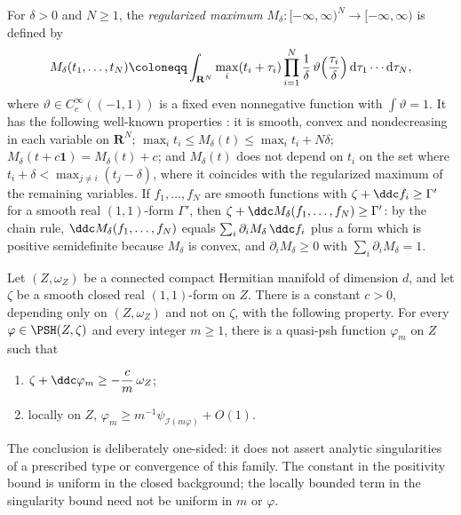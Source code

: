 For $\delta>0$ and $N\ge1$, the \emph{regularized maximum}
$M_\delta\colon[-\infty,\infty)^N\to[-\infty,\infty)$ is defined by
\[
  M_\delta(t_1,\dots,t_N)\coloneqq \int_{\mathbf R^N}\max_i(t_i+\tau_i)
  \prod_{i=1}^N\frac1\delta\,\vartheta\Bigl(\frac{\tau_i}\delta\Bigr)
  \,\mathrm{d}\tau_1\cdots \mathrm{d}\tau_N,
\]
where $\vartheta\in C^\infty_c((-1,1))$ is a fixed even nonnegative
function with $\int\vartheta=1$. It has the following well-known
properties \cite[Chapter~I, Lemma~5.18]{DemCADG}: it is smooth, convex and
nondecreasing in each variable on $\mathbf R^N$;
$\max_it_i\le M_\delta(t)\le\max_it_i+N\delta$;
$M_\delta(t+c\mathbf 1)=M_\delta(t)+c$; and $M_\delta(t)$ does not
depend on $t_i$ on the set where
$t_i+\delta<\max_{j\ne i}(t_j-\delta)$, where it coincides with the
regularized maximum of the remaining variables. If $f_1,\dots,f_N$ are
smooth functions with $\zeta+\ddc f_i\ge\Gamma'$ for a smooth real
$(1,1)$-form $\Gamma'$, then
$\zeta+\ddc M_\delta(f_1,\dots,f_N)\ge\Gamma'$: by the chain rule,
$\ddc M_\delta(f_1,\dots,f_N)$ equals
$\sum_i\partial_iM_\delta\,\ddc f_i$ plus a form which is positive
semidefinite because $M_\delta$ is convex, and
$\partial_iM_\delta\ge0$ with $\sum_i\partial_iM_\delta=1$.
\begin{lemma}\label{nk:lem:regularization}
Let $(Z,\omega_Z)$ be a connected compact Hermitian manifold of
dimension $d$,
and let $\zeta$ be a smooth closed real $(1,1)$-form on $Z$. There
is a constant $c>0$, depending only on $(Z,\omega_Z)$ and not on
$\zeta$, with the following property. For every
$\varphi\in\PSH(Z,\zeta)$ and every integer $m\ge1$, there is a
quasi-psh function $\varphi_m$ on $Z$ such that
\begin{enumerate}[label=(\roman*),leftmargin=*,itemsep=.2em,topsep=.3em]
\item\label{nk:it:reg-positivity}
  $\zeta+\ddc\varphi_m\ge-\dfrac{c}{m}\,\omega_Z$;
\item\label{nk:it:reg-lower} locally on $Z$,
  $\varphi_m\ge m^{-1}\psi_{\mathcal I(m\varphi)}+O(1)$.
\end{enumerate}
\end{lemma}

The conclusion is deliberately one-sided: it does not assert analytic singularities of a prescribed type or convergence of this family. The constant in the positivity bound is uniform in the closed background; the locally bounded term in the singularity bound need not be uniform in $m$ or $\varphi$.
 
